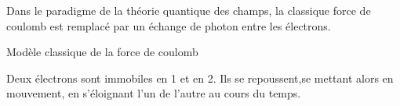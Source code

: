 Dans le paradigme de la théorie quantique des champs, la classique force de coulomb est remplacé par un échange de photon entre les électrons.

\begin{minipage}[c]{.45\linewidth}
\begin{center}
Modèle classique de la force de coulomb
\end{center}
Deux électrons sont immobiles en 1 et en 2. Ils se repoussent,se mettant alors en mouvement, en s'éloignant l'un de l'autre au cours du temps.

\end{minipage}
\hfill
\begin{minipage}[c]{.45\linewidth}
\end{minipage}

\vspace {.7cm}

